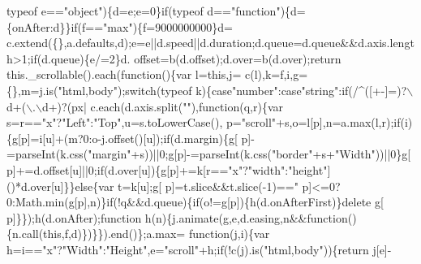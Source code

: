 \begin{DoxyCode}
      typeof e==\textcolor{stringliteral}{"object"})\{d=e;e=0\}\textcolor{keywordflow}{if}(typeof d==\textcolor{stringliteral}{"function"})\{d=\{onAfter:d\}\}\textcolor{keywordflow}{if}(f==\textcolor{stringliteral}{"max"})\{f=9000000000\}d=
      c.extend(\{\},a.defaults,d);e=e||d.speed||d.duration;d.queue=d.queue&&d.axis.length>1;\textcolor{keywordflow}{if}(d.queue)\{e/=2\}d.
      offset=b(d.offset);d.over=b(d.over);\textcolor{keywordflow}{return} this.\_scrollable().each(\textcolor{keyword}{function}()\{var l=\textcolor{keyword}{this},j=
      c(l),k=f,i,g=\{\},m=j.is(\textcolor{stringliteral}{"html,body"});\textcolor{keywordflow}{switch}(typeof k)\{\textcolor{keywordflow}{case}\textcolor{stringliteral}{"number"}:\textcolor{keywordflow}{case}\textcolor{stringliteral}{"string"}:\textcolor{keywordflow}{if}(/^([+-]=)?\(\backslash\)d+(\(\backslash\).\(\backslash\)d+)?(px|
      c.each(d.axis.split(\textcolor{stringliteral}{""}),\textcolor{keyword}{function}(q,r)\{var s=r==\textcolor{stringliteral}{"x"}?\textcolor{stringliteral}{"Left"}:\textcolor{stringliteral}{"Top"},u=s.toLowerCase(),
      p=\textcolor{stringliteral}{"scroll"}+s,o=l[p],n=a.max(l,r);\textcolor{keywordflow}{if}(i)\{g[p]=i[u]+(m?0:o-j.offset()[u]);\textcolor{keywordflow}{if}(d.margin)\{g[
      p]-=parseInt(k.css(\textcolor{stringliteral}{"margin"}+s))||0;g[p]-=parseInt(k.css(\textcolor{stringliteral}{"border"}+s+\textcolor{stringliteral}{"Width"}))||0\}g[
      p]+=d.offset[u]||0;\textcolor{keywordflow}{if}(d.over[u])\{g[p]+=k[r==\textcolor{stringliteral}{"x"}?\textcolor{stringliteral}{"width"}:\textcolor{stringliteral}{"height"}]()*d.over[u]\}\}\textcolor{keywordflow}{else}\{var t=k[u];g[
      p]=t.slice&&t.slice(-1)==\textcolor{stringliteral}{"%
      p]<=0?0:Math.min(g[p],n)\}\textcolor{keywordflow}{if}(!q&&d.queue)\{\textcolor{keywordflow}{if}(o!=g[p])\{h(d.onAfterFirst)\}\textcolor{keyword}{delete} g[
      p]\}\});h(d.onAfter);\textcolor{keyword}{function} h(n)\{j.animate(g,e,d.easing,n&&\textcolor{keyword}{function}()\{n.call(this,f,d)\})\}\}).end()\};a.max=\textcolor{keyword}{
      function}(j,i)\{var h=i==\textcolor{stringliteral}{"x"}?\textcolor{stringliteral}{"Width"}:\textcolor{stringliteral}{"Height"},e=\textcolor{stringliteral}{"scroll"}+h;\textcolor{keywordflow}{if}(!c(j).is(\textcolor{stringliteral}{"html,body"}))\{\textcolor{keywordflow}{return} j[e]-
}
\end{DoxyCode}
